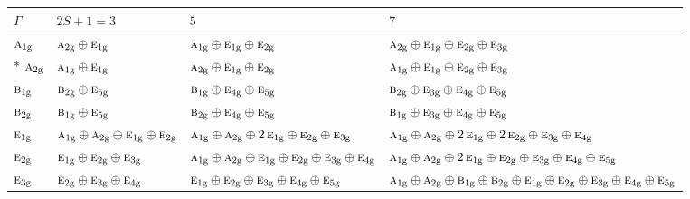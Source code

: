 \documentclass[10pt,a4paper]{article}
\numberwithin{equation}{section}
\newcommand{\irr}[1]{\text{\normalfont\scshape #1}}
\newcommand{\ptag}[1]{\mathrm{#1}}
\begin{document}
{\small\setlength{\tabcolsep}{3pt}\begin{longtable}{@{}l>{\RaggedRight\arraybackslash}p{}>{\RaggedRight\arraybackslash}p{}>{\RaggedRight\arraybackslash}p{}@{}}\toprule
$\Gamma$ & $2S + 1 = 3$ & $5$ & $7$\\\midrule\endhead
\bottomrule\endfoot\endlastfoot
$\irr{a}_{1\ptag{g}}$ & $\irr{a}_{2\ptag{g}}\oplus \irr{e}_{1\ptag{g}}$ & $\irr{a}_{1\ptag{g}}\oplus \irr{e}_{1\ptag{g}}\oplus \irr{e}_{2\ptag{g}}$ & $\irr{a}_{2\ptag{g}}\oplus \irr{e}_{1\ptag{g}}\oplus \irr{e}_{2\ptag{g}}\oplus \irr{e}_{3\ptag{g}}$\\*
$\irr{a}_{2\ptag{g}}$ & $\irr{a}_{1\ptag{g}}\oplus \irr{e}_{1\ptag{g}}$ & $\irr{a}_{2\ptag{g}}\oplus \irr{e}_{1\ptag{g}}\oplus \irr{e}_{2\ptag{g}}$ & $\irr{a}_{1\ptag{g}}\oplus \irr{e}_{1\ptag{g}}\oplus \irr{e}_{2\ptag{g}}\oplus \irr{e}_{3\ptag{g}}$\\
$\irr{b}_{1\ptag{g}}$ & $\irr{b}_{2\ptag{g}}\oplus \irr{e}_{5\ptag{g}}$ & $\irr{b}_{1\ptag{g}}\oplus \irr{e}_{4\ptag{g}}\oplus \irr{e}_{5\ptag{g}}$ & $\irr{b}_{2\ptag{g}}\oplus \irr{e}_{3\ptag{g}}\oplus \irr{e}_{4\ptag{g}}\oplus \irr{e}_{5\ptag{g}}$\\
$\irr{b}_{2\ptag{g}}$ & $\irr{b}_{1\ptag{g}}\oplus \irr{e}_{5\ptag{g}}$ & $\irr{b}_{2\ptag{g}}\oplus \irr{e}_{4\ptag{g}}\oplus \irr{e}_{5\ptag{g}}$ & $\irr{b}_{1\ptag{g}}\oplus \irr{e}_{3\ptag{g}}\oplus \irr{e}_{4\ptag{g}}\oplus \irr{e}_{5\ptag{g}}$\\
$\irr{e}_{1\ptag{g}}$ & $\irr{a}_{1\ptag{g}}\oplus \irr{a}_{2\ptag{g}}\oplus \irr{e}_{1\ptag{g}}\oplus \irr{e}_{2\ptag{g}}$ & $\irr{a}_{1\ptag{g}}\oplus \irr{a}_{2\ptag{g}}\oplus 2\,\irr{e}_{1\ptag{g}}\oplus \irr{e}_{2\ptag{g}}\oplus \irr{e}_{3\ptag{g}}$ & $\irr{a}_{1\ptag{g}}\oplus \irr{a}_{2\ptag{g}}\oplus 2\,\irr{e}_{1\ptag{g}}\oplus 2\,\irr{e}_{2\ptag{g}}\oplus \irr{e}_{3\ptag{g}}\oplus \irr{e}_{4\ptag{g}}$\\
$\irr{e}_{2\ptag{g}}$ & $\irr{e}_{1\ptag{g}}\oplus \irr{e}_{2\ptag{g}}\oplus \irr{e}_{3\ptag{g}}$ & $\irr{a}_{1\ptag{g}}\oplus \irr{a}_{2\ptag{g}}\oplus \irr{e}_{1\ptag{g}}\oplus \irr{e}_{2\ptag{g}}\oplus \irr{e}_{3\ptag{g}}\oplus \irr{e}_{4\ptag{g}}$ & $\irr{a}_{1\ptag{g}}\oplus \irr{a}_{2\ptag{g}}\oplus 2\,\irr{e}_{1\ptag{g}}\oplus \irr{e}_{2\ptag{g}}\oplus \irr{e}_{3\ptag{g}}\oplus \irr{e}_{4\ptag{g}}\oplus \irr{e}_{5\ptag{g}}$\\
$\irr{e}_{3\ptag{g}}$ & $\irr{e}_{2\ptag{g}}\oplus \irr{e}_{3\ptag{g}}\oplus \irr{e}_{4\ptag{g}}$ & $\irr{e}_{1\ptag{g}}\oplus \irr{e}_{2\ptag{g}}\oplus \irr{e}_{3\ptag{g}}\oplus \irr{e}_{4\ptag{g}}\oplus \irr{e}_{5\ptag{g}}$ & $\irr{a}_{1\ptag{g}}\oplus \irr{a}_{2\ptag{g}}\oplus \irr{b}_{1\ptag{g}}\oplus \irr{b}_{2\ptag{g}}\oplus \irr{e}_{1\ptag{g}}\oplus \irr{e}_{2\ptag{g}}\oplus \irr{e}_{3\ptag{g}}\oplus \irr{e}_{4\ptag{g}}\oplus \irr{e}_{5\ptag{g}}$\\

\end{longtable}}
\end{document}
